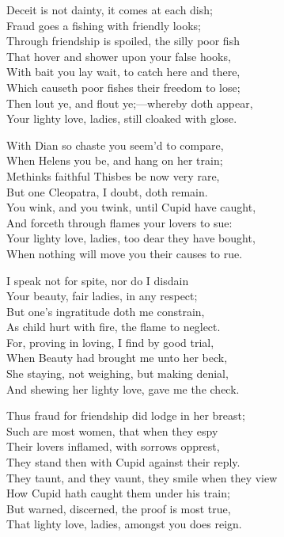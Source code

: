 \begin{dcverse}\footnotesize
Deceit is not dainty, it comes at each dish;\\
Fraud goes a fishing with friendly looks;\\
Through friendship is spoiled, the silly poor fish\\
That hover and shower upon your false hooks,\\
With bait you lay wait, to catch here and there,\\
Which causeth poor fishes their freedom to lose;\\
Then lout ye, and flout ye;—whereby doth appear,\\
Your lighty love, ladies, still cloaked with glose.

With Dian so chaste you seem’d to compare,\\
When Helens you be, and hang on her train;\\
Methinks faithful Thisbes be now very rare,\\
But one Cleopatra, I doubt, doth remain.\\
You wink, and you twink, until Cupid have caught,\\
And forceth through flames your lovers to sue:\\
Your lighty love, ladies, too dear they have bought, \\
When nothing will move you their causes to rue.

I speak not for spite, nor do I disdain\\
Your beauty, fair ladies, in any respect;\\
But one’s ingratitude doth me constrain,\\
As child hurt with fire, the flame to neglect.\\
For, proving in loving, I find by good trial,\\
When Beauty had brought me unto her beck,\\
She staying, not weighing, but making denial,\\
And shewing her lighty love, gave me the check.

Thus fraud for friendship did lodge in her breast;\\
Such are most women, that when they espy\\
Their lovers inflamed, with sorrows opprest,\\
They stand then with Cupid against their reply.\\
They taunt, and they vaunt, they smile when they view\\
How Cupid hath caught them under his train;\\
But warned, discerned, the proof is most true,\\
That lighty love, ladies, amongst you does reign.


\end{dcverse}
